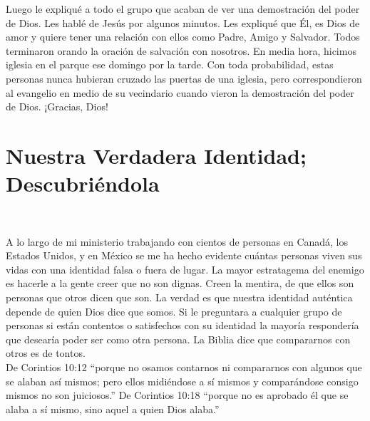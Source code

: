 \documentclass[twoside, 12pt]{book}
\begin{document}
Luego le expliqué a todo el grupo que acaban de ver una demostración del poder de Dios. Les hablé de Jesús por algunos minutos. Les expliqué que Él, es Dios de amor y quiere tener una relación con ellos como Padre, Amigo y Salvador. Todos terminaron orando la oración de salvación con nosotros. En media hora, hicimos iglesia en el parque ese domingo por la tarde. Con toda probabilidad, estas personas nunca hubieran cruzado las puertas de una iglesia, pero correspondieron al evangelio en medio de su vecindario cuando vieron la demostración del poder de Dios. ¡Gracias, Dios!\\



\chapter{Nuestra Verdadera Identidad; Descubriéndola}
\

A lo largo de mi ministerio trabajando con cientos de personas en Canadá, los Estados Unidos, y en México se me ha hecho evidente cuántas personas viven sus vidas con una identidad falsa o fuera de lugar. La mayor estratagema del enemigo es hacerle a la gente creer que no son dignas. Creen la mentira, de que ellos son personas que otros dicen que son. La verdad es que nuestra identidad auténtica depende de quien Dios dice que somos. Si le preguntara a cualquier grupo de personas si están contentos o satisfechos con su identidad la mayoría respondería que desearía poder ser como otra persona. La Biblia dice que compararnos con otros es de tontos.\\

De Corintios 10:12 “porque no osamos contarnos ni compararnos con algunos que se alaban así mismos; pero ellos midiéndose a sí mismos y comparándose consigo mismos no son juiciosos.” De Corintios 10:18 “porque no es aprobado él que se alaba a sí mismo, sino aquel a quien Dios alaba.”\\
\end{document}
